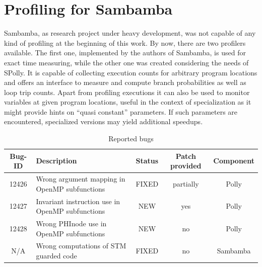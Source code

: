 

    




\section{Profiling for Sambamba}

Sambamba, as research project under heavy development, was not capable of any kind
of profiling at the beginning of this work. 
By now, there are two profilers available.
The first one, implemented by the authors of Sambamba, 
is used for exact time measuring, while the other one was created considering
the needs of SPolly. It is capable of collecting execution counts for arbitrary
program locations and offers an interface to measure and compute
branch probabilities as well as loop trip counts. Apart from profiling executions
it can also be used to monitor variables at given program locations, useful 
in the context of specialization as it might
provide hints on ``quasi constant'' parameters. If such parameters are encountered,
specialized versions may yield additional speedups. 




\begin{table}[htbp]
\begin{framed}
  \centering
  \caption{Reported bugs}
  \begin{tabularx}{\textwidth}{ c | X | c | c | c }
   Bug-ID & Description & Status & Patch provided  & Component \\
  \hline \hline
  12426 & Wrong argument mapping in OpenMP subfunctions & FIXED & partially & Polly \\
   \hline
  12427 & Invariant instruction use in OpenMP subfunctions & NEW & yes & Polly \\
   \hline
  12428 & Wrong PHInode use in OpenMP subfunctions & NEW & no & Polly \\
   \hline
    N/A & Wrong computations of STM guarded code & FIXED & no & Sambamba \\
  \end{tabularx}
  \label{tab:Bugreports}
\end{framed}
\end{table}



